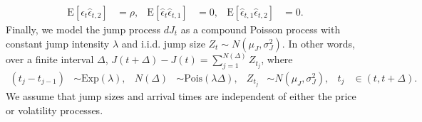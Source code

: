 \documentclass[10pt]{article}
\newcommand{\E}[1]{\mbox{E}\left[#1\right]}
\newcommand{\Exp}[1]{\mbox{Exp}\left(#1\right)}
\newcommand{\Pois}[1]{\mbox{Pois}\left(#1\right)}
\begin{document}
\begin{align*}
  \E{\hat{\epsilon}_{t}\hat{\epsilon}_{t,2}} &= \rho, & \E{\hat{\epsilon}_{t}\hat{\epsilon}_{t,1}} &= 0, & \E{\hat{\epsilon}_{t,1}\hat{\epsilon}_{t,2}} &= 0.
\end{align*}
Finally, we model the jump process $dJ_t$ as a compound Poisson process with constant jump intensity $\lambda$ and i.i.d. jump size $Z_t \sim N(\mu_J, \sigma^2_J)$. In other words, over a finite interval $\Delta$, $J(t+\Delta) - J(t) = \sum_{j=1}^{N(\Delta)} Z_{t_j}$, where
\begin{align}
  (t_{j} - t_{j-1}) &\sim \Exp{\lambda}, & N(\Delta) &\sim \Pois{\lambda\Delta}, & Z_{t_j} &\sim N(\mu_J, \sigma_J^2), & t_j &\in (t, t+\Delta). \label{eq:jumps-def}
\end{align}
We assume that jump sizes and arrival times are independent of either the price or volatility processes.
\end{document}
